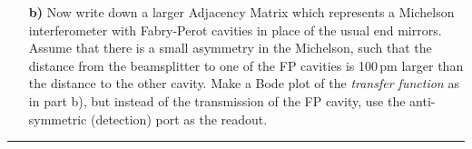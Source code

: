 \documentclass[11pt]{article}
\begin{document}
\begin{enumerate}
\begin{itemize}
\item[\bf b)] Now write down a larger Adjacency Matrix which represents a Michelson interferometer with Fabry-Perot cavities in place of the usual end mirrors. Assume that there is a small asymmetry in the Michelson, such that the distance from the beamsplitter to one of the FP cavities is 100\,pm larger than the distance to the other cavity.
Make a Bode plot of the \emph{transfer function} as in part b), but instead of the transmission of the FP cavity, use the anti-symmetric (detection) port as the readout.
\end{itemize}

\end{enumerate}

\bigskip
{\color{Sepia} \hrule}
\end{document}

